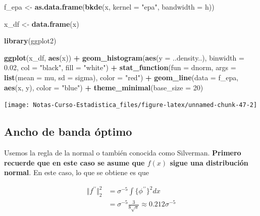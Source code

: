 \documentclass[
  12pt,
]{book}
\newenvironment{Shaded}{\begin{snugshade}}{\end{snugshade}}
\newcommand{\DataTypeTok}[1]{\textcolor[rgb]{0.13,0.29,0.53}{#1}}
\newcommand{\DecValTok}[1]{\textcolor[rgb]{0.00,0.00,0.81}{#1}}
\newcommand{\FloatTok}[1]{\textcolor[rgb]{0.00,0.00,0.81}{#1}}
\newcommand{\KeywordTok}[1]{\textcolor[rgb]{0.13,0.29,0.53}{\textbf{#1}}}
\newcommand{\NormalTok}[1]{#1}
\newcommand{\OperatorTok}[1]{\textcolor[rgb]{0.81,0.36,0.00}{\textbf{#1}}}
\newcommand{\StringTok}[1]{\textcolor[rgb]{0.31,0.60,0.02}{#1}}
\theoremstyle{definition}
\theoremstyle{definition}
\theoremstyle{definition}
\theoremstyle{remark}
\begin{document}
\begin{Shaded}
\begin{Highlighting}[]
\NormalTok{f_epa <-}\StringTok{ }\KeywordTok{as.data.frame}\NormalTok{(}\KeywordTok{bkde}\NormalTok{(x, }\DataTypeTok{kernel =} \StringTok{"epa"}\NormalTok{, }\DataTypeTok{bandwidth =}\NormalTok{ h))}

\NormalTok{x_df <-}\StringTok{ }\KeywordTok{data.frame}\NormalTok{(x)}

\KeywordTok{library}\NormalTok{(ggplot2)}

\KeywordTok{ggplot}\NormalTok{(x_df, }\KeywordTok{aes}\NormalTok{(x)) }\OperatorTok{+}\StringTok{ }\KeywordTok{geom_histogram}\NormalTok{(}\KeywordTok{aes}\NormalTok{(}\DataTypeTok{y =}\NormalTok{ ..density..), }
    \DataTypeTok{binwidth =} \FloatTok{0.02}\NormalTok{, }\DataTypeTok{col =} \StringTok{"black"}\NormalTok{, }\DataTypeTok{fill =} \StringTok{"white"}\NormalTok{) }\OperatorTok{+}\StringTok{ }
\StringTok{    }\KeywordTok{stat_function}\NormalTok{(}\DataTypeTok{fun =}\NormalTok{ dnorm, }\DataTypeTok{args =} \KeywordTok{list}\NormalTok{(}\DataTypeTok{mean =}\NormalTok{ mu, }
        \DataTypeTok{sd =}\NormalTok{ sigma), }\DataTypeTok{color =} \StringTok{"red"}\NormalTok{) }\OperatorTok{+}\StringTok{ }\KeywordTok{geom_line}\NormalTok{(}\DataTypeTok{data =}\NormalTok{ f_epa, }
    \KeywordTok{aes}\NormalTok{(x, y), }\DataTypeTok{color =} \StringTok{"blue"}\NormalTok{) }\OperatorTok{+}\StringTok{ }\KeywordTok{theme_minimal}\NormalTok{(}\DataTypeTok{base_size =} \DecValTok{20}\NormalTok{)}
\end{Highlighting}
\end{Shaded}

\begin{center}\texttt{[image: Notas-Curso-Estadistica\_files/figure-latex/unnamed-chunk-47-2]} \end{center}

\hypertarget{ancho-de-banda-uxf3ptimo-1}{%
\subsection{Ancho de banda óptimo}\label{ancho-de-banda-uxf3ptimo-1}}

Usemos la regla de la normal o también conocida como Silverman.
\textbf{Primero recuerde que en este caso se asume que \(f(x)\) sigue una distribución normal}. En este caso, lo que se obtiene es que

\begin{align*}
\Vert f^{\prime \prime} \Vert_2^2 & = \sigma ^{-5} \int \{\phi^{\prime \prime}\}^2 dx              \\
& = \sigma ^{-5} \frac{3}{8\sqrt{\pi}} \approx 0.212 \sigma^{-5}
\end{align*}
\end{document}
